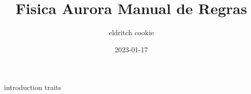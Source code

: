 \documentclass[portuguese]{book}
\title{Fisica Aurora Manual de Regras}
\date{2023-01-17}
\author{eldritch cookie}
\begin{document}
  \maketitle
  \newpage
  \tableofcontents
  {introduction}
  {traits}
\end{document}
